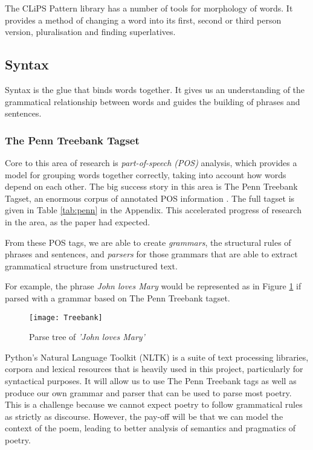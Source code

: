 The CLiPS Pattern library has a number of tools for morphology of words. It provides a method of changing a word into its first, second or third person version, pluralisation and finding superlatives.\cite{de2012pattern}


\subsection{Syntax}
\label{sec:syntax}
Syntax is the glue that binds words together. It gives us an understanding of the grammatical relationship between words and guides the building of phrases and sentences.

\subsubsection{The Penn Treebank Tagset}

Core to this area of research is \textit{part-of-speech (POS)} analysis, which provides a model for grouping words together correctly, taking into account how words depend on each other. The big success story in this area is The Penn Treebank Tagset, an enormous corpus of annotated POS information \cite{marcus1993building}. The full tagset is given in Table \ref{tab:penn} in the Appendix. This accelerated progress of research in the area, as the paper had expected. 

From these POS tags, we are able to create \textit{grammars}, the structural rules of phrases and sentences, and \textit{parsers} for those grammars that are able to extract grammatical structure from unstructured text.

For example, the phrase \textit{John loves Mary} would be represented as in Figure \ref{fig:parse} if parsed with a grammar based on The Penn Treebank tagset.

\begin{figure}[h!]
\centering
\texttt{[image: Treebank]}
\caption{Parse tree of \textit{'John loves Mary'}}
\label{fig:parse}
\end{figure}

Python's Natural Language Toolkit (NLTK)\cite{bird2009natural} is a suite of text processing libraries, corpora and lexical resources that is heavily used in this project, particularly for syntactical purposes. It will allow us to use The Penn Treebank tags as well as produce our own grammar and parser that can be used to parse most poetry. This is a challenge because we cannot expect poetry to follow grammatical rules as strictly as discourse. However, the pay-off will be that we can model the context of the poem, leading to better analysis of semantics and pragmatics of poetry.

